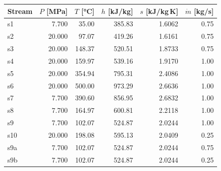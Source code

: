 \begin{tabular}{@{}lrrrrr@{}}
\toprule
Stream & $P$ [MPa] & $T$ [\si{\celsius}] & $h$ [kJ/kg] & $s$ [kJ/kg\,K] & $\dot m$ [kg/s] \\
\midrule
s1 & 7.700 & 35.00 & 385.83 & 1.6062 & 0.75 \\
s2 & 20.000 & 97.07 & 419.26 & 1.6161 & 0.75 \\
s3 & 20.000 & 148.37 & 520.51 & 1.8733 & 0.75 \\
s4 & 20.000 & 159.97 & 539.16 & 1.9170 & 1.00 \\
s5 & 20.000 & 354.94 & 795.31 & 2.4086 & 1.00 \\
s6 & 20.000 & 500.00 & 973.29 & 2.6636 & 1.00 \\
s7 & 7.700 & 390.60 & 856.95 & 2.6832 & 1.00 \\
s8 & 7.700 & 164.97 & 600.81 & 2.2118 & 1.00 \\
s9 & 7.700 & 102.07 & 524.87 & 2.0244 & 1.00 \\
s10 & 20.000 & 198.08 & 595.13 & 2.0409 & 0.25 \\
s9a & 7.700 & 102.07 & 524.87 & 2.0244 & 0.75 \\
s9b & 7.700 & 102.07 & 524.87 & 2.0244 & 0.25 \\
\bottomrule
\end{tabular}
